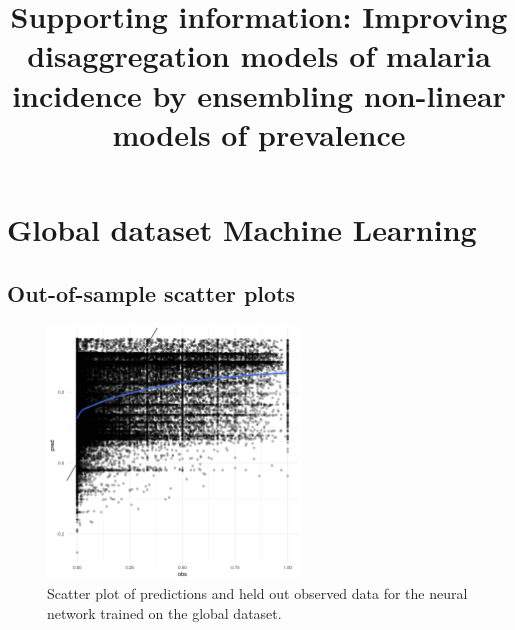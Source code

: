 \documentclass[review]{elsarticle}
\begin{document}









\begin{frontmatter}

\title{Supporting information: Improving disaggregation models of malaria incidence by ensembling non-linear models of prevalence}

\end{frontmatter}

\clearpage
\tableofcontents


\clearpage
\section{Global dataset Machine Learning}

\clearpage
\subsection{Out-of-sample scatter plots}


\begin{figure}[h!]
  \centering
  \includegraphics[width=0.6\textwidth]{figs/SI/nnet_obspred_global.png}
\caption{
  Scatter plot of predictions and held out observed data for the neural network trained on the global dataset.
}

\end{figure}
\end{document}
